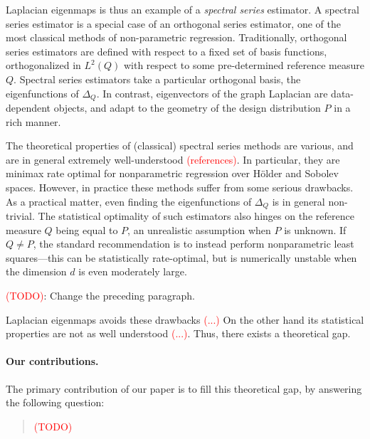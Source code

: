 \documentclass{article}
\newcommand{\1}{\mathbf{1}}
\theoremstyle{alden}
\theoremstyle{aldenthm}
\theoremstyle{definition}
\theoremstyle{remark}
\begin{document}
Laplacian eigenmaps is thus an example of a \emph{spectral series} estimator. A spectral series estimator is a special case of an orthogonal series estimator, one of the most classical methods of non-parametric regression. Traditionally, orthogonal series estimators are defined with respect to a fixed set of basis functions, orthogonalized in $L^2(Q)$ with respect to some pre-determined reference measure $Q$. Spectral series estimators take a particular orthogonal basis, the eigenfunctions of $\Delta_Q$. In contrast, eigenvectors of the graph Laplacian are data-dependent objects, and adapt to the geometry of the design distribution $P$ in a rich manner. 

The theoretical properties of (classical) spectral series methods are various, and are in general extremely well-understood \textcolor{red}{(references)}. In particular, they are minimax rate optimal for nonparametric regression over H\"{o}lder and Sobolev spaces. However, in practice these methods suffer from some serious drawbacks. As a practical matter,  even finding the eigenfunctions of $\Delta_Q$ is in general non-trivial. The statistical optimality of such estimators also hinges on the reference measure $Q$ being equal to $P$, an unrealistic assumption when $P$ is unknown. If $Q \neq P$, the standard recommendation is to instead perform nonparametric least squares---this can be statistically rate-optimal, but is numerically unstable when the dimension $d$ is even moderately large. 

\textcolor{red}{(TODO)}: Change the preceding paragraph.

Laplacian eigenmaps avoids these drawbacks \textcolor{red}{(...)} On the other hand its statistical properties are not as well understood \textcolor{red}{(...)}. Thus, there exists a theoretical gap. 

\paragraph{Our contributions.} The primary contribution of our paper is to fill this theoretical gap, by answering the following question:

\begin{quote}
	\textcolor{red}{(TODO)}
\end{quote}
\end{document}
